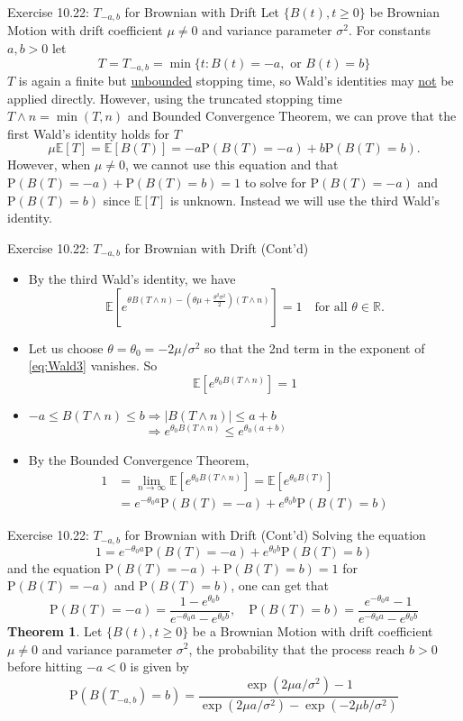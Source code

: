 \documentclass[letterpaper,handout]{beamer}
\def\p{\mathrm P}
\def\E{\mathbb E}
\begin{document}
\begin{frame}{Exercise 10.22: $T_{-a,b}$ for Brownian with Drift }
Let $\{B(t),t\ge 0\}$ be Brownian Motion with drift coefficient $\mu\neq0$ and variance parameter $\sigma^2$.
For constants $a,b>0$ let
$$T=T_{-a,b}=\min\{t: B(t)=-a,\mbox{ or }B(t)=b\}$$
$T$ is again a finite but \underline{unbounded} stopping time, so Wald's identities may \underline{not} be applied directly. However, using the truncated stopping time $T\wedge n=\min(T,n)$ and Bounded Convergence Theorem, we can prove that the first Wald's identity holds for $T$
$$\mu\E[T]=\E[B(T)]=-a\p(B(T)=-a)+b\p(B(T)=b).$$
However, when $\mu\neq 0$, we cannot use this equation and that $\p(B(T)=-a)+\p(B(T)=b)=1$ to solve for $\p(B(T)=-a)$ and $\p(B(T)=b)$ since $\E[T]$ is unknown. Instead we will use the third Wald's identity.
\end{frame}
\begin{frame}{Exercise 10.22: $T_{-a,b}$ for Brownian with Drift (Cont'd)}
\begin{itemize}
\item By the third Wald's identity, we have
\begin{equation}\label{eq:Wald3}
\E[e^{\theta B(T\wedge n)-(\theta\mu+\frac{\theta^2\sigma^2}{2})(T\wedge n)}]=1\quad\text{for all }\theta\in\mathbb{R}.
\end{equation}
\item Let us choose $\theta=\theta_0=-2\mu/\sigma^2$ so that the 2nd term in the exponent of \eqref{eq:Wald3} vanishes. So
$$\E[e^{\theta_0 B(T\wedge n)}]=1$$
\item $-a\le B(T\wedge n)\le b\Rightarrow |B(T\wedge n)|\le a+b $\\[5pt]
$\phantom{-a\le B(T\wedge n)\le b}\Rightarrow e^{\theta_0 B(T\wedge n)}\le e^{\theta_0 (a+b)}$
\item By the Bounded Convergence Theorem,
\begin{align*}
1&=\lim_{n\to\infty}\E[e^{\theta_0 B(T\wedge n)}]=\E[e^{\theta_0 B(T)}]\\
&=e^{-\theta_0 a}\p(B(T)=-a)+e^{\theta_0 b}\p(B(T)=b)
\end{align*}
\end{itemize}
\end{frame}
\begin{frame}{Exercise 10.22: $T_{-a,b}$ for Brownian with Drift (Cont'd)}
Solving the equation
$$1=e^{-\theta_0 a}\p(B(T)=-a)+e^{\theta_0 b}\p(B(T)=b)$$
and the equation $\p(B(T)=-a)+\p(B(T)=b)=1$ for $\p(B(T)=-a)$ and $\p(B(T)=b)$,
one can get that
$$
\p(B(T)=-a)=\frac{1-e^{\theta_0b}}{e^{-\theta_0a}-e^{\theta_0b}},\quad
\p(B(T)= b)=\frac{e^{-\theta_0a}-1}{e^{-\theta_0a}-e^{\theta_0b}}
$$
\textbf{Theorem 1}. Let $\{B(t),t\ge 0\}$ be a Brownian Motion with drift coefficient $\mu \neq 0$ and variance parameter $\sigma^2$, the probability that the process reach $b>0$ before hitting $-a<0$ is given by
$$
\p(B(T_{-a,b})=b)=\frac{\exp(2\mu a/\sigma^2)-1}{\exp(2\mu a/\sigma^2)-\exp(-2\mu b/\sigma^2)}
$$
\end{frame}
\end{document}
